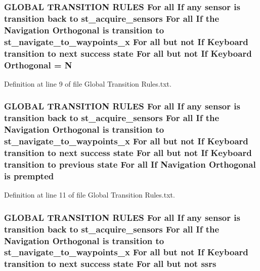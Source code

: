 \subsubsection[{\texorpdfstring{Orthogonal}{Orthogonal}}]{\setlength{\rightskip}{0pt plus 5cm}G\+L\+O\+B\+AL T\+R\+A\+N\+S\+I\+T\+I\+ON R\+U\+L\+ES For all If any sensor is transition back to st\+\_\+acquire\+\_\+sensors For all If the Navigation Orthogonal is transition to st\+\_\+navigate\+\_\+to\+\_\+waypoints\+\_\+x For all but not If Keyboard transition to next success state For all but not If Keyboard Orthogonal = N}\hypertarget{Global_01Transition_01Rules_8txt_a2e1cdec29dad5013e514270d0a78fe22}{}\label{Global_01Transition_01Rules_8txt_a2e1cdec29dad5013e514270d0a78fe22}


Definition at line 9 of file Global Transition Rules.\+txt.

\subsubsection[{\texorpdfstring{prempted}{prempted}}]{\setlength{\rightskip}{0pt plus 5cm}G\+L\+O\+B\+AL T\+R\+A\+N\+S\+I\+T\+I\+ON R\+U\+L\+ES For all If any sensor is transition back to st\+\_\+acquire\+\_\+sensors For all If the Navigation {\bf Orthogonal} is transition to st\+\_\+navigate\+\_\+to\+\_\+waypoints\+\_\+x For all but not If Keyboard transition to next success state For all but not If Keyboard transition to previous state For all If Navigation {\bf Orthogonal} is prempted}\hypertarget{Global_01Transition_01Rules_8txt_ac6583c64beac40f27e253c605d5d5b5b}{}\label{Global_01Transition_01Rules_8txt_ac6583c64beac40f27e253c605d5d5b5b}


Definition at line 11 of file Global Transition Rules.\+txt.

\subsubsection[{\texorpdfstring{ssrs}{ssrs}}]{\setlength{\rightskip}{0pt plus 5cm}G\+L\+O\+B\+AL T\+R\+A\+N\+S\+I\+T\+I\+ON R\+U\+L\+ES For all If any sensor is transition back to st\+\_\+acquire\+\_\+sensors For all If the Navigation {\bf Orthogonal} is transition to st\+\_\+navigate\+\_\+to\+\_\+waypoints\+\_\+x For all but not If Keyboard transition to next success state For all but not ssrs}\hypertarget{Global_01Transition_01Rules_8txt_aa881c6a22397113c3342bf4c44212934}{}\label{Global_01Transition_01Rules_8txt_aa881c6a22397113c3342bf4c44212934}



